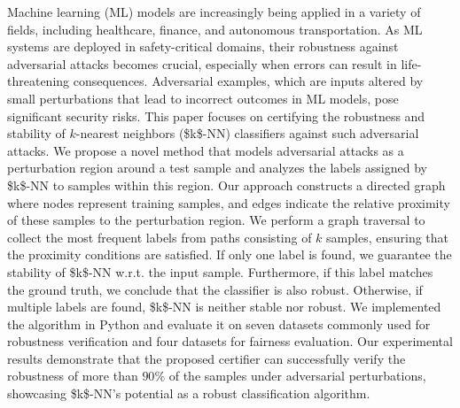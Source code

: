 
Machine learning (ML) models are increasingly being applied in a variety of fields, including healthcare, finance, and autonomous transportation. As ML systems are deployed in safety-critical domains, their robustness against adversarial attacks becomes crucial, especially when errors can result in life-threatening consequences. Adversarial examples, which are inputs altered by small perturbations that lead to incorrect outcomes in ML models, pose significant security risks. This paper focuses on certifying the robustness and stability of $k$-nearest neighbors (\acs{$k$-NN}) classifiers against such adversarial attacks. We propose a novel method that models adversarial attacks as a perturbation region around a test sample and analyzes the labels assigned by \acs{$k$-NN} to samples within this region. Our approach constructs a directed graph where nodes represent training samples, and edges indicate the relative proximity of these samples to the perturbation region. We perform a graph traversal to collect the most frequent labels from paths consisting of $k$ samples, ensuring that the proximity conditions are satisfied. If only one label is found, we guarantee the stability of \acs{$k$-NN} w.r.t. the input sample. Furthermore, if this label matches the ground truth, we conclude that the classifier is also robust. Otherwise, if multiple labels are found, \acs{$k$-NN} is neither stable nor robust. We implemented the algorithm in Python and evaluate it on seven datasets commonly used for robustness verification and four datasets for fairness evaluation. Our experimental results demonstrate that the proposed certifier can successfully verify the robustness of more than $90\%$ of the samples under adversarial perturbations, showcasing \acs{$k$-NN}'s potential as a robust classification algorithm.
